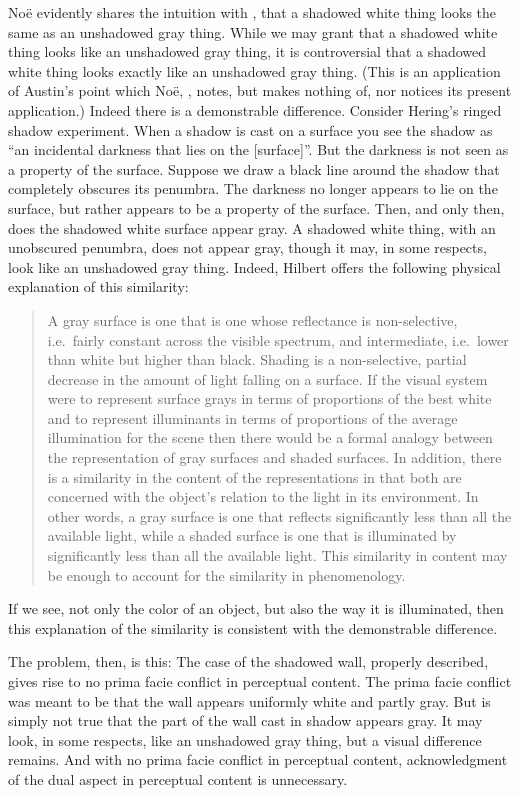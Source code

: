 \documentclass[12pt]{article}
\begin{document}
Noë evidently shares the intuition with \citet[88]{Chalmers:2006kx}, that a shadowed white thing looks the same as an unshadowed gray thing. While we may grant that a shadowed white thing looks like an unshadowed gray thing, it is controversial that a shadowed white thing looks exactly like an unshadowed gray thing. (This is an application of Austin's point which Noë, \citeyear[80]{Noe:2004fk}, notes, but makes nothing of, nor notices its present application.) Indeed there is a demonstrable difference. Consider Hering's \citeyearpar[8]{Hering:1920ty} ringed shadow experiment. When a shadow is cast on a surface you see the shadow as ``an incidental darkness that lies on the [surface]''. But the darkness is not seen as a property of the surface. Suppose we draw a black line around the shadow that completely obscures its penumbra. The darkness no longer appears to lie on the surface, but rather appears to be a property of the surface. Then, and only then, does the shadowed white surface appear gray. A shadowed white thing, with an unobscured penumbra, does not appear gray, though it may, in some respects, look like an unshadowed gray thing. Indeed, Hilbert offers the following physical explanation of this similarity:
	\begin{quote}
		A gray surface is one that is one whose reflectance is non-selective, i.e.\ fairly constant across the visible spectrum, and intermediate, i.e.\ lower than white but higher than black. Shading is a non-selective, partial decrease in the amount of light falling on a surface. If the visual system were to represent surface grays in terms of proportions of the best white and to represent illuminants in terms of proportions of the average illumination for the scene then there would be a formal analogy between the representation of gray surfaces and shaded surfaces. In addition, there is a similarity in the content of the representations in that both are concerned with the object’s relation to the light in its environment. In other words, a gray surface is one that reflects significantly less than all the available light, while a shaded surface is one that is illuminated by significantly less than all the available light. This similarity in content may be enough to account for the similarity in phenomenology. \citep[xx]{Hilbert:2007qy}
	\end{quote}
If we see, not only the color of an object, but also the way it is illuminated, then this explanation of the similarity is consistent with the demonstrable difference.

The problem, then, is this: The case of the shadowed wall, properly described, gives rise to no prima facie conflict in perceptual content. The prima facie conflict was meant to be that the wall appears uniformly white and partly gray. But is simply not true that the part of the wall cast in shadow appears gray. It may look, in some respects, like an unshadowed gray thing, but a visual difference remains. And with no prima facie conflict in perceptual content, acknowledgment of the dual aspect in perceptual content is unnecessary.
\end{document}

